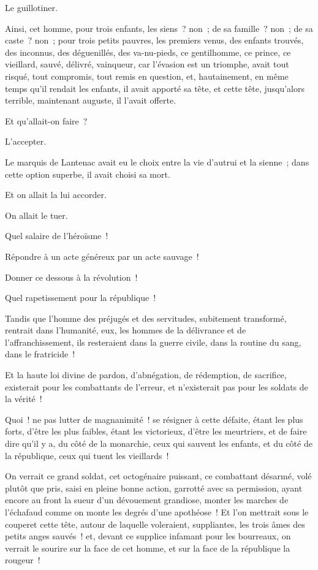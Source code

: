 \documentclass[french,twoside]{book} %
\begin{document}
Le guillotiner.\par
Ainsi, cet homme, pour trois enfants, les siens ? non ; de sa famille ? non ; de sa caste ? non ; pour trois petits pauvres, les premiers venus, des enfants  trouvés, des inconnus, des déguenillés, des va-nu-pieds, ce gentilhomme, ce prince, ce vieillard, sauvé, délivré, vainqueur, car l’évasion est un triomphe, avait tout risqué, tout compromis, tout remis en question, et, hautainement, en même temps qu’il rendait les enfants, il avait apporté sa tête, et cette tête, jusqu’alors terrible, maintenant auguste, il l’avait offerte.\par
Et qu’allait-on faire ?\par
L’accepter.\par
Le marquis de Lantenac avait eu le choix entre la vie d’autrui et la sienne ; dans cette option superbe, il avait choisi sa mort.\par
Et on allait la lui accorder.\par
On allait le tuer.\par
Quel salaire de l’héroïsme !\par
Répondre à un acte généreux par un acte sauvage !\par
Donner ce dessous à la révolution !\par
Quel rapetissement pour la république !\par
Tandis que l’homme des préjugés et des servitudes, subitement transformé, rentrait dans l’humanité, eux, les hommes de la délivrance et de l’affranchissement, ils resteraient dans la guerre civile, dans la routine du sang, dans le fratricide !\par
Et la haute loi divine de pardon, d’abnégation, de rédemption, de sacrifice, existerait pour les combattants de l’erreur, et n’existerait pas pour les soldats de la vérité !\par
Quoi ! ne pas lutter de magnanimité ! se résigner à cette défaite, étant les plus forts, d’être les plus  faibles, étant les victorieux, d’être les meurtriers, et de faire dire qu’il y a, du côté de la monarchie, ceux qui sauvent les enfants, et du côté de la république, ceux qui tuent les vieillards !\par
On verrait ce grand soldat, cet octogénaire puissant, ce combattant désarmé, volé plutôt que pris, saisi en pleine bonne action, garrotté avec sa permission, ayant encore au front la sueur d’un dévouement grandiose, monter les marches de l’échafaud comme on monte les degrés d’une apothéose ! Et l’on mettrait sous le couperet cette tête, autour de laquelle voleraient, suppliantes, les trois âmes des petits anges sauvés ! et, devant ce supplice infamant pour les bourreaux, on verrait le sourire sur la face de cet homme, et sur la face de la république la rougeur !\par
\end{document}

